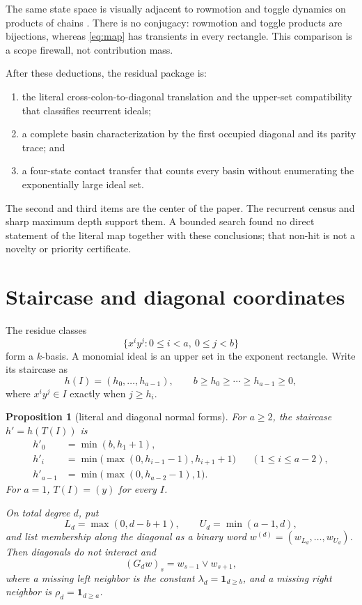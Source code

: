 \documentclass[10pt,a4paper]{amsart}
\newtheorem{proposition}[theorem]{Proposition}
\theoremstyle{definition}
\theoremstyle{remark}
\begin{document}
The same state space is visually adjacent to rowmotion and toggle dynamics
on products of chains \cite{StrikerWilliams2012,EinsteinPropp2021}.  There is
no conjugacy: rowmotion and toggle products are bijections, whereas
\eqref{eq:map} has transients in every rectangle.  This comparison is a
scope firewall, not contribution mass.

After these deductions, the residual package is:
\begin{enumerate}[label=\textup{(\roman*)}]
\item the literal cross-colon-to-diagonal translation and the upper-set
      compatibility that classifies recurrent ideals;
\item a complete basin characterization by the first occupied diagonal and
      its parity trace; and
\item a four-state contact transfer that counts every basin without
      enumerating the exponentially large ideal set.
\end{enumerate}
The second and third items are the center of the paper.  The recurrent census
and sharp maximum depth support them.  A bounded search found no direct
statement of the literal map together with these conclusions; that non-hit
is not a novelty or priority certificate.

\section{Staircase and diagonal coordinates}

The residue classes
\[
             \{x^iy^j:0\leq i<a,\ 0\leq j<b\}              \tag{2.1}
\]
form a \(k\)-basis.  A monomial ideal is an upper set in the exponent
rectangle.  Write its staircase as
\[
 h(I)=(h_0,\ldots,h_{a-1}),\qquad
 b\geq h_0\geq\cdots\geq h_{a-1}\geq0,                    \tag{2.2}
\]
where \(x^iy^j\in I\) exactly when \(j\geq h_i\).

\begin{proposition}[literal and diagonal normal forms]\label{prop:normal}
For \(a\geq2\), the staircase \(h'=h(T(I))\) is
\[
\begin{aligned}
h'_0&=\min(b,h_1+1),\\
h'_i&=\min\!\bigl(\max(0,h_{i-1}-1),h_{i+1}+1\bigr)
      &&(1\leq i\leq a-2),\\
h'_{a-1}&=\min\!\bigl(\max(0,h_{a-2}-1),1\bigr).
\end{aligned}                                             \tag{2.3}\label{eq:stair}
\]
For \(a=1\), \(T(I)=(y)\) for every \(I\).

On total degree \(d\), put
\[
 L_d=\max(0,d-b+1),\qquad U_d=\min(a-1,d),
\]
and list membership along the diagonal as a binary word
\(w^{(d)}=(w_{L_d},\ldots,w_{U_d})\).  Then diagonals do not interact and
\[
 (G_d w)_s=w_{s-1}\vee w_{s+1},                           \tag{2.4}\label{eq:path}
\]
where a missing left neighbor is the constant
\(\lambda_d=\mathbf1_{d\geq b}\), and a missing right neighbor is
\(\rho_d=\mathbf1_{d\geq a}\).
\end{proposition}
\end{document}
